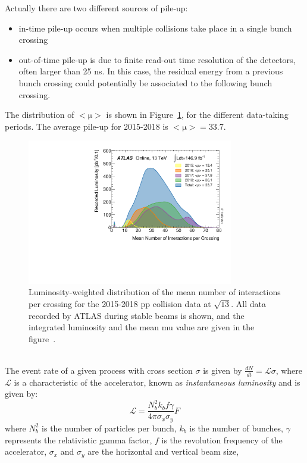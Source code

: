 Actually there are two different sources of pile-up:
\begin{itemize}
	\item in-time pile-up occurs when multiple collisions take place in a single bunch crossing
	\item out-of-time pile-up is due to finite read-out time resolution of the detectors, often larger than 25 ns. In this case, the residual energy from
	a previous bunch crossing could potentially be associated to the following bunch crossing.
\end{itemize}
\newpage
\noindent The distribution of $\mathrm{<\mu>}$ is shown in Figure~\ref{fig:pileup}, for the different data-taking periods. The average pile-up for 2015-2018 is $\mathrm{<\mu>=33.7}$.
\begin{figure}[h]
	\centering
	\includegraphics[width=9cm]{Chapters/CH2/figures/mu_2015_2018}
	\caption{Luminosity-weighted distribution of the mean number of interactions per crossing for the 2015-2018 pp collision data at $\mathrm{\sqrt{13}}$.  All data recorded by ATLAS during stable beams is shown, and the integrated luminosity and the mean mu value are given in the figure~\cite{lumi}.}
	\label{fig:pileup}
\end{figure}
\\The event rate of a given process with cross section $\sigma$ is given by $\frac{dN}{dt}=\mathcal{L} \sigma$, where $\mathcal{L}$ is 
a characteristic of the accelerator, known as \textit{instantaneous luminosity} and is given by:
\begin{equation}
\mathcal{L} =  \frac{N^{2}_{b}k_{b}f\gamma}{4\pi\sigma_{x}\sigma_{y}}F
\end{equation}
where $N^{2}_{b}$ is the number of particles per bunch, 
$k_{b}$ is the number of bunches, 
$\gamma$ represents the relativistic gamma factor, 
$f$ is the revolution frequency of the accelerator, 
$\sigma_{x}$ and $\sigma_{y}$ are the horizontal and vertical beam size, 
